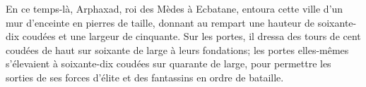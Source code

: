 En ce temps-là, Arphaxad, roi des Mèdes à Ecbatane,
	entoura cette ville d’un mur d’enceinte en pierres de taille,
	donnant au rempart une hauteur de soixante-dix coudées et une largeur de cinquante.
Sur les portes, il dressa des tours
	de cent coudées de haut sur soixante de large à leurs fondations;
	les portes elles-mêmes s’élevaient à soixante-dix coudées sur quarante de large,
	pour permettre les sorties de ses forces d’élite
		et des fantassins en ordre de bataille.

